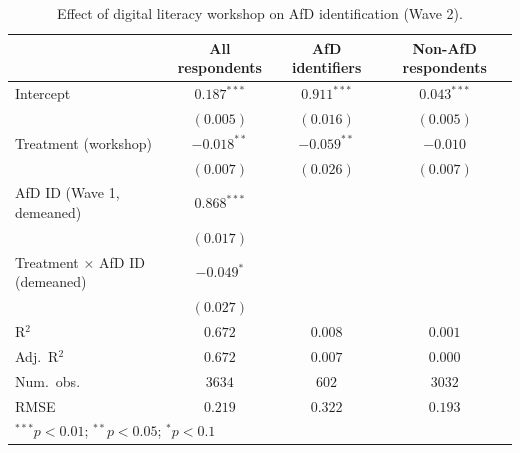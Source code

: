 
\begin{table}
\begin{center}
\begin{tabular}{l c c c}
\hline
 & All respondents & AfD identifiers & Non-AfD respondents \\
\hline
Intercept                     & $0.187^{***}$ & $0.911^{***}$ & $0.043^{***}$ \\
                              & $(0.005)$     & $(0.016)$     & $(0.005)$     \\
Treatment (workshop)          & $-0.018^{**}$ & $-0.059^{**}$ & $-0.010$      \\
                              & $(0.007)$     & $(0.026)$     & $(0.007)$     \\
AfD ID (Wave 1, demeaned)     & $0.868^{***}$ &               &               \\
                              & $(0.017)$     &               &               \\
Treatment × AfD ID (demeaned) & $-0.049^{*}$  &               &               \\
                              & $(0.027)$     &               &               \\
\hline
R$^2$                         & $0.672$       & $0.008$       & $0.001$       \\
Adj.\ R$^2$                   & $0.672$       & $0.007$       & $0.000$       \\
Num.\ obs.                    & $3634$        & $602$         & $3032$        \\
RMSE                          & $0.219$       & $0.322$       & $0.193$       \\
\hline
\multicolumn{4}{l}{\scriptsize{$^{***}p<0.01$; $^{**}p<0.05$; $^{*}p<0.1$}}
\end{tabular}
\caption{Effect of digital literacy workshop on AfD identification (Wave 2).}
\label{tab:afd_maintained_support}
\end{center}
\end{table}
